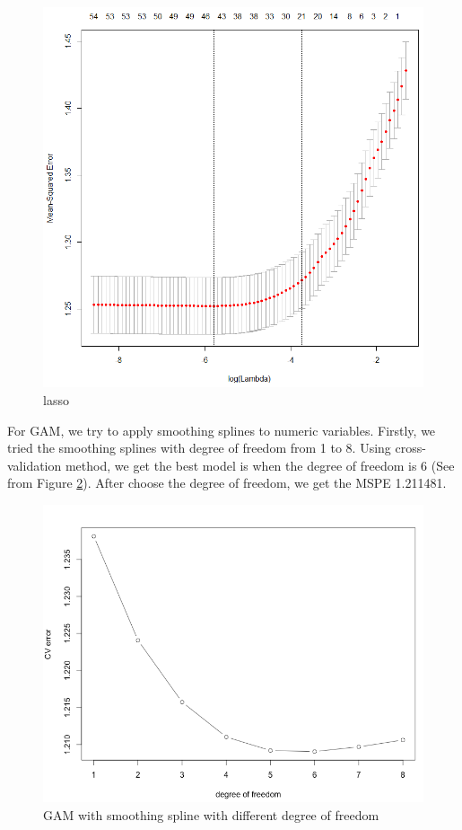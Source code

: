 \documentclass[12pt]{article}
\begin{document}
    \begin{figure}[h]
        \centering
        \includegraphics[width=0.7\linewidth]{lasso_plot.png}
        \caption{lasso}
        \label{fig:lasso}
    \end{figure}
    
For GAM, we try to apply smoothing splines to numeric variables. Firstly, we tried the smoothing splines with degree of freedom from 1 to 8. Using cross-validation method, we get the best model is when the degree of freedom is 6 (See from Figure \ref{fig:gam}). After choose the degree of freedom, we get the MSPE 1.211481. \\ 

    \begin{figure}[h]
        \centering
        \includegraphics[width=0.9\linewidth]{gam_plot.png}
        \caption{GAM with smoothing spline with different degree of freedom}
        \label{fig:gam}
    \end{figure}
\end{document}
